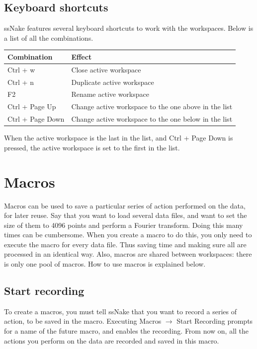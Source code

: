 \documentclass[11pt,a4paper]{article}
\begin{document}
\subsection{Keyboard shortcuts}
ssNake features several keyboard shortcuts to work with the workspaces. Below is a list of all the combinations.
\begin{center}
\begin{tabular}{ll}
\toprule
Combination & Effect \\
\midrule
\rowcolor{gray!30!white}
Ctrl + w & Close active workspace\\
Ctrl + n & Duplicate active workspace\\
\rowcolor{gray!30!white}
F2 & Rename active workspace\\
Ctrl + Page Up & Change active workspace to the one above in the list\\
\rowcolor{gray!30!white}
Ctrl + Page Down & Change active workspace to the one below in the list\\
\bottomrule
\end{tabular}
\end{center}
When the active workspace is the last in the list, and Ctrl + Page Down is pressed, the active workspace is set to the first in the list.

\section{Macros}
Macros can be used to save a particular series of action performed on the data, for later reuse. Say that you want to load several data files, and want to set the size of them to 4096 points and perform a Fourier transform. Doing this many times can be cumbersome. When you create a macro to do this, you only need to execute the macro for every data file. Thus saving time and making sure all are processed in an identical way. Also, macros are shared between workspaces: there is only one pool of macros. How to use macros is explained below.

\subsection{Start recording}
To create a macros, you must tell ssNake that you want to record a series of action, to be saved in the macro. Executing Macros $\rightarrow$ Start Recording prompts for a name of the future macro, and enables the recording. From now on, all the actions you perform on the data are recorded and saved in this macro.
\end{document}
